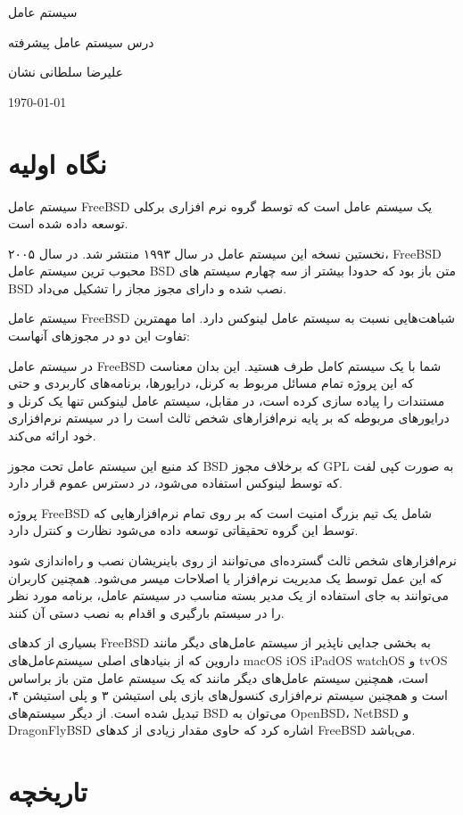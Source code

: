\documentclass[20pt, a4paper]{article}
\begin{document}
\centerline{سیستم عامل }
\centerline{درس سیستم عامل پیشرفته}
\centerline{علیرضا سلطانی نشان}
\centerline{\today}
\tableofcontents

\section{نگاه اولیه}

سیستم عامل FreeBSD یک سیستم عامل  است که توسط گروه نرم افزاری
برکلی توسعه داده شده است.

نخستین نسخه این سیستم عامل در سال ۱۹۹۳ منتشر شد. در سال ۲۰۰۵، FreeBSD محبوب ترین
سیستم عامل BSD متن باز بود که حدودا بیشتر از سه چهارم سیستم های BSD نصب شده و
دارای مجوز مجاز را تشکیل می‌داد.

سیستم عامل FreeBSD شباهت‌هایی نسبت به سیستم عامل لینوکس دارد. اما مهمترین تفاوت
این دو در مجوز‌های آنهاست:

در سیستم عامل FreeBSD شما با یک سیستم کامل طرف هستید. این بدان معناست که این
پروژه تمام مسائل مربوط به کرنل، درایور‌ها، برنامه‌های کاربردی و حتی مستندات را
پیاده سازی کرده است، در مقابل، سیستم عامل لینوکس تنها یک کرنل و درایور‌های
مربوطه که بر پایه نرم‌افزار‌های شخص ثالث است را در سیستم نرم‌افزاری خود ارائه
می‌کند.

کد منبع این سیستم عامل تحت مجوز BSD که برخلاف مجوز GPL به صورت کپی لفت که توسط
لینوکس استفاده می‌شود، در دسترس عموم قرار دارد.


پروژه FreeBSD شامل یک تیم بزرگ امنیت است که بر روی تمام نرم‌افزار‌هایی که توسط
این گروه تحقیقاتی توسعه داده می‌شود نظارت و کنترل دارد.

نرم‌افزار‌های شخص ثالث گسترده‌ای می‌توانند از روی باینریشان نصب و راه‌اندازی شود
که این عمل توسط یک مدیریت نرم‌افزار یا اصلاحات  میسر  
می‌شود. همچنین کاربران می‌توانند به جای استفاده از یک مدیر بسته مناسب در سیستم
عامل، برنامه مورد نظر را در سیستم بارگیری و اقدام به نصب دستی آن کنند.

بسیاری از کد‌های FreeBSD به بخشی جدایی ناپذیر از سیستم عامل‌های دیگر مانند
داروین که از بنیادهای اصلی سیستم‌عامل‌های macOS iOS iPadOS watchOS و tvOS است،
همچنین سیستم عامل‌های دیگر مانند  که یک سیستم عامل متن باز براساس
 است و همچنین سیستم نرم‌افزاری کنسول‌های بازی پلی استیشن ۳ و پلی
استیشن ۴، تبدیل شده است. از دیگر سیستم‌های BSD می‌توان به OpenBSD، NetBSD و
DragonFlyBSD اشاره کرد که حاوی مقدار زیادی از کد‌های FreeBSD می‌باشد.

\section{تاریخچه}
\end{document}
